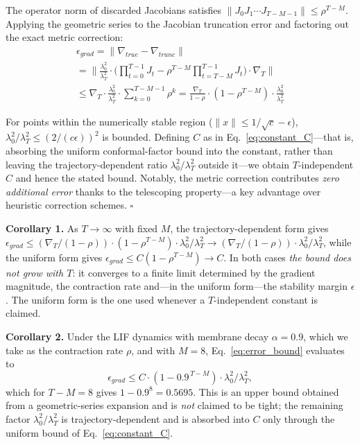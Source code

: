 \documentclass[a4paper,fleqn]{cas-dc}
\begin{document}
The operator norm of discarded Jacobians satisfies $\|J_0 J_1 \cdots J_{T-M-1}\| \leq \rho^{T-M}$. Applying the geometric series to the Jacobian truncation error and factoring out the exact metric correction:
\begin{multline}
\epsilon_{grad} = \|\nabla_{true} - \nabla_{trunc}\| \\
= \Big\|\frac{\lambda_0^2}{\lambda_T^2} \cdot
   \bigl({\textstyle\prod_{t=0}^{T-1}} J_t -
    \rho^{T-M} {\textstyle\prod_{t=T-M}^{T-1}} J_t\bigr) \cdot
   \nabla_T\Big\| \\
\leq \nabla_T \cdot \frac{\lambda_0^2}{\lambda_T^2} \cdot
   \sum_{k=0}^{T-M-1} \rho^k
 = \frac{\nabla_T}{1-\rho} \cdot (1 - \rho^{T-M}) \cdot
   \frac{\lambda_0^2}{\lambda_T^2}
\label{eq:proof_bound}
\end{multline}

For points within the numerically stable region ($\|x\| \leq 1/\sqrt{c} - \epsilon$), $\lambda_0^2/\lambda_T^2 \leq (2/(c\epsilon))^2$ is bounded. Defining $C$ as in Eq.~\eqref{eq:constant_C}---that is, absorbing the uniform conformal-factor bound into the constant, rather than leaving the trajectory-dependent ratio $\lambda_0^2/\lambda_T^2$ outside it---we obtain $T$-independent $C$ and hence the stated bound. Notably, the metric correction contributes \textit{zero additional error} thanks to the telescoping property---a key advantage over heuristic correction schemes. $\square$

\textbf{Corollary 1.} As $T \to \infty$ with fixed $M$, the trajectory-dependent form gives $\epsilon_{grad} \leq (\nabla_T/(1-\rho))\cdot(1-\rho^{T-M})\cdot\lambda_0^2/\lambda_T^2 \to (\nabla_T/(1-\rho))\cdot\lambda_0^2/\lambda_T^2$, while the uniform form gives $\epsilon_{grad} \leq C(1-\rho^{T-M}) \to C$. In both cases \emph{the bound does not grow with $T$}: it converges to a finite limit determined by the gradient magnitude, the contraction rate and---in the uniform form---the stability margin $\epsilon$. The uniform form is the one used whenever a $T$-independent constant is claimed.

\textbf{Corollary 2.} Under the LIF dynamics with membrane decay $\alpha{=}0.9$, which we take as the contraction rate $\rho$, and with $M{=}8$, Eq.~\eqref{eq:error_bound} evaluates to
\begin{equation}
\epsilon_{grad} \leq C \cdot \left(1 - 0.9^{\,T-M}\right) \cdot \lambda_0^2/\lambda_T^2,
\label{eq:corollary2}
\end{equation}
which for $T{-}M{=}8$ gives $1 - 0.9^{8} = 0.5695$. This is an upper bound obtained from a geometric-series expansion and is \emph{not} claimed to be tight; the remaining factor $\lambda_0^2/\lambda_T^2$ is trajectory-dependent and is absorbed into $C$ only through the uniform bound of Eq.~\eqref{eq:constant_C}.
\end{document}
